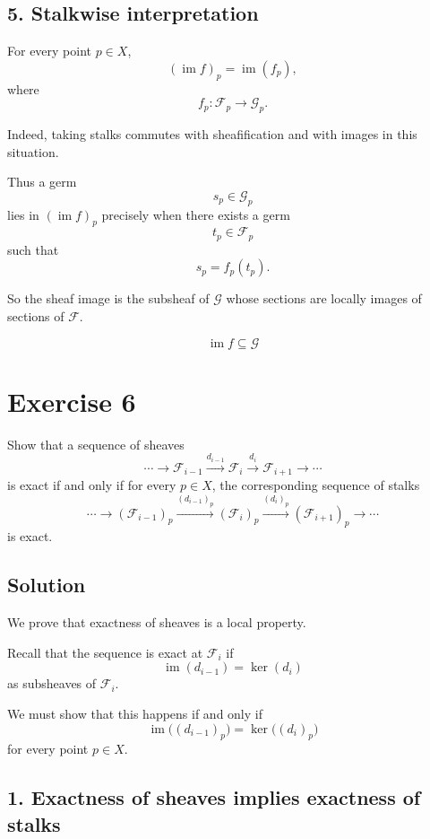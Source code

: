 \documentclass[12pt,a4paper]{article}
\begin{document}
\subsection*{5. Stalkwise interpretation}

For every point $p \in X$,
\[
(\operatorname{im} f)_p
=
\operatorname{im}(f_p),
\]
where
\[
f_p : \mathcal F_p \longrightarrow \mathcal G_p.
\]

Indeed, taking stalks commutes with sheafification and with images in this
situation.

Thus a germ
\[
s_p \in \mathcal G_p
\]
lies in $(\operatorname{im} f)_p$ precisely when there exists a germ
\[
t_p \in \mathcal F_p
\]
such that
\[
s_p = f_p(t_p).
\]

So the sheaf image is the subsheaf of $\mathcal G$ whose sections are locally
images of sections of $\mathcal F$.

\[
\boxed{
	\operatorname{im} f
	\subseteq
	\mathcal G
}
\]

\newpage

\section*{Exercise 6}

Show that a sequence of sheaves
\[
\cdots
\longrightarrow
\mathcal F_{i-1}
\xrightarrow{d_{i-1}}
\mathcal F_i
\xrightarrow{d_i}
\mathcal F_{i+1}
\longrightarrow
\cdots
\]
is exact if and only if for every $p \in X$, the corresponding sequence of
stalks
\[
\cdots
\longrightarrow
(\mathcal F_{i-1})_p
\xrightarrow{(d_{i-1})_p}
(\mathcal F_i)_p
\xrightarrow{(d_i)_p}
(\mathcal F_{i+1})_p
\longrightarrow
\cdots
\]
is exact.

\subsection*{Solution}

We prove that exactness of sheaves is a local property.

Recall that the sequence is exact at $\mathcal F_i$ if
\[
\operatorname{im}(d_{i-1})
=
\ker(d_i)
\]
as subsheaves of $\mathcal F_i$.

We must show that this happens if and only if
\[
\operatorname{im}\bigl((d_{i-1})_p\bigr)
=
\ker\bigl((d_i)_p\bigr)
\]
for every point $p \in X$.

\subsection*{1. Exactness of sheaves implies exactness of stalks}
\end{document}
